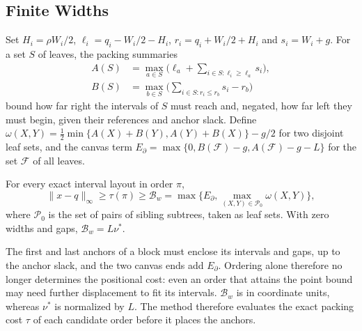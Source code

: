\subsection{Finite Widths}
Set $H_i=\rho W_i/2$, $\ell_i=q_i-W_i/2-H_i$, $r_i=q_i+W_i/2+H_i$ and $s_i=W_i+g$. For a set $S$ of leaves, the packing summaries
\begin{equation}\label{eq:packing}
\begin{split}
A(S)&=\max_{a\in S}\bigl(\ell_a+\sum_{i\in S:\ell_i\ge\ell_a}s_i\bigr),\\
B(S)&=\max_{b\in S}\bigl(\sum_{i\in S:r_i\le r_b}s_i-r_b\bigr)
\end{split}
\end{equation}
bound how far right the intervals of $S$ must reach and, negated, how far left they must begin, given their references and anchor slack. Define $\omega(X,Y)=\tfrac12\min\{A(X)+B(Y),A(Y)+B(X)\}-g/2$ for two disjoint leaf sets, and the canvas term $E_\partial=\max\{0,B(\mathcal F)-g,A(\mathcal F)-g-L\}$ for the set $\mathcal F$ of all leaves.
\begin{proposition}\label{thm:width}
For every exact interval layout in order $\pi$,
\begin{equation}\label{eq:widthbound}
\|x-q\|_\infty\ge\tau(\pi)\ge\mathcal B_w
=\max\{E_\partial,\max_{(X,Y)\in\mathcal P_0}\omega(X,Y)\},
\end{equation}
where $\mathcal P_0$ is the set of pairs of sibling subtrees, taken as leaf sets. With zero widths and gaps, $\mathcal B_w=L\nu^*$.
\end{proposition}
The first and last anchors of a block must enclose its intervals and gaps, up to the anchor slack, and the two canvas ends add $E_\partial$. Ordering alone therefore no longer determines the positional cost: even an order that attains the point bound may need further displacement to fit its intervals. $\mathcal B_w$ is in coordinate units, whereas $\nu^*$ is normalized by $L$. The method therefore evaluates the exact packing cost $\tau$ of each candidate order before it places the anchors.


